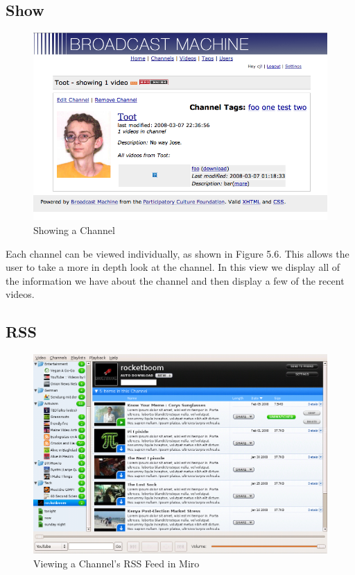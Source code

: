 \documentclass[a4paper,12pt]{report}
\begin{document}
\subsection{Show}
\begin{figure}[htp]
\begin{center}
\includegraphics[width=150mm]{./images/channelshow.png}
\end{center}
\caption{Showing a Channel}
\end{figure}

Each channel can be viewed individually, as shown in Figure 5.6.
This allows the user to take a more in depth look at the channel.
In this view we display all of the information we have about the channel and then display a few of the recent videos.

\subsection{RSS}
\begin{figure}[htp]
\begin{center}
\includegraphics[width=150mm]{./images/channelrss.png}
\end{center}
\caption{Viewing a Channel's RSS Feed in Miro}
\end{figure}
\end{document}
